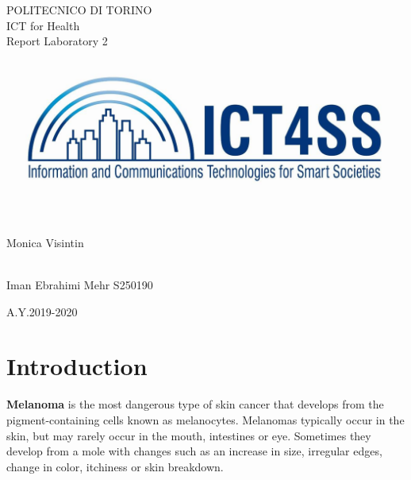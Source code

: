 \documentclass[a4paper,12pt,oneside,titlepage]{article}
\begin{document}
	
	\thispagestyle{empty}
	\setcounter{page}{0}
	
	\begin{center}
		\huge
		POLITECNICO DI TORINO\\[1.cm]
		\Large
		ICT for Health \\
		\vspace{0.5cm}
		\Large
		Report Laboratory 2\\[1.3cm]
		
		\vspace{0.5cm}
		\includegraphics[scale=2]{logo.jpg}
	\end{center}
	\vspace{1.cm}
	
	\begin{flushleft}
		\Large
		\\
		Monica Visintin\\[0.2cm]
	\end{flushleft}
	\vspace{1cm}
	
	
	\begin{flushright} 
		\Large
		\\
		Iman Ebrahimi Mehr S250190\\[0.2cm]
	\end{flushright} 
	\vspace{2cm}
	\begin{center}
		\Large
		A.Y.2019-2020
	\end{center}
	
	\newpage
	\thispagestyle{empty}
	\tableofcontents
	
	
	\newpage
	\section{Introduction}
	
	\textbf{Melanoma} is the most dangerous type of skin cancer that develops from the pigment-containing cells known as melanocytes. Melanomas typically occur in the skin, but may rarely occur in the mouth, intestines or eye. Sometimes they develop from a mole with changes such as an increase in size, irregular edges, change in color, itchiness or skin breakdown.
	
\end{document}
